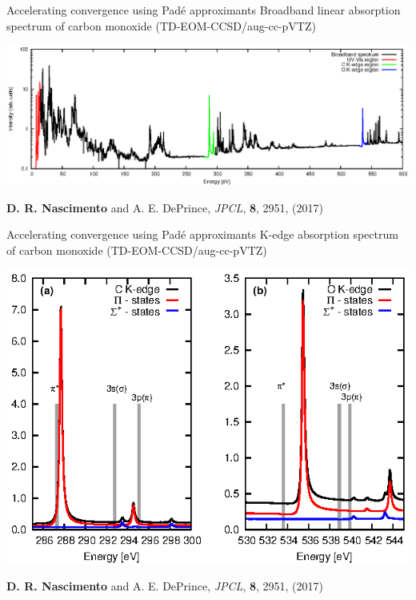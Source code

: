 \documentclass{beamer}
\begin{document}
\begin{frame}{Accelerating convergence using Pad{\'e} approximants}
Broadband linear absorption spectrum of carbon monoxide (TD-EOM-CCSD/aug-cc-pVTZ)
\begin{center}
 \includegraphics[scale=0.65]{figures/broad.eps}\\
\end{center}
\footnotesize{{\bf D. R. Nascimento} and A. E. DePrince, {\it JPCL}, {\bf 8}, 2951, (2017)} 
\end{frame}

\begin{frame}{Accelerating convergence using Pad{\'e} approximants}
K-edge absorption spectrum of carbon monoxide (TD-EOM-CCSD/aug-cc-pVTZ)
\begin{center}
 \includegraphics[scale=1.0]{figures/kedge.eps}\\
\end{center}
\footnotesize{{\bf D. R. Nascimento} and A. E. DePrince, {\it JPCL}, {\bf 8}, 2951, (2017)} 
\end{frame}
\end{document}
